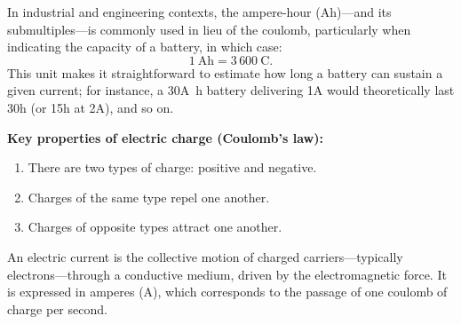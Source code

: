 \documentclass[11pt]{article}
\begin{document}
\begin{figure}[!h]
  \centering
\end{figure}

In industrial and engineering contexts, the ampere‑hour (Ah)—and its
submultiples—is commonly used in lieu of the coulomb, particularly
when indicating the capacity of a battery, in which case:
\[
  1~\unit{\ampere\hour} = 3\,600~\unit{\coulomb}.
\]
This unit makes it straightforward to estimate how long a battery can
sustain a given current; for instance, a 30\unit{\ampere\hour} battery
delivering 1\unit{\ampere}
would theoretically last 30\unit{\hour} (or 15\unit{\hour} at
2\unit{\ampere}), and so
on.

\textbf{Key properties of electric charge (Coulomb’s law):}
\begin{enumerate}
  \item There are two types of charge: positive and negative.
  \item Charges of the same type repel one another.
  \item Charges of opposite types attract one another.
\end{enumerate}

An electric current is the collective motion of charged
carriers—typically electrons—through a conductive medium, driven by
the electromagnetic force. It is expressed in amperes (\unit{\ampere}),
which corresponds to the passage of one coulomb of charge per
second.
\end{document}
